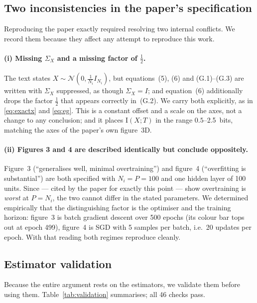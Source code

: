 \documentclass[11pt,a4paper]{article}
\newcommand{\I}{\mathrm{I}}
\newcommand{\Norm}{\mathcal{N}}
\begin{document}
\subsection{Two inconsistencies in the paper's specification}
\label{sec:inconsistencies}

Reproducing the paper exactly required resolving two internal conflicts. We
record them because they affect any attempt to reproduce this work.

\paragraph{(i) Missing $\Sigma_X$ and a missing factor of $\tfrac12$.} The text
states $X\sim\Norm(0,\tfrac{1}{N_i}I_{N_i})$, but equations~(5), (6) and
(G.1)--(G.3) are written with $\Sigma_X$ suppressed, as though $\Sigma_X=I$;
and equation~(6) additionally drops the factor $\tfrac12$ that appears correctly
in~(G.2). We carry both explicitly, as in \eqref{eq:exactx} and \eqref{eq:eg}.
This is a constant offset and a scale on the axes, not a change to any
conclusion; and it places $\I(X;T)$ in the range $0.5$--\SI{2.5}{bits}, matching
the axes of the paper's own figure~3D.

\paragraph{(ii) Figures 3 and 4 are described identically but conclude
oppositely.} Figure~3 (``generalises well, minimal overtraining'') and figure~4
(``overfitting is substantial'') are both specified with $N_i = P = 100$ and one
hidden layer of 100 units. Since \citet{advani2017high} --- cited by the paper
for exactly this point --- show overtraining is \emph{worst} at $P=N_i$, the two
cannot differ in the stated parameters. We determined empirically that the
distinguishing factor is the optimiser and the training horizon: figure~3 is
batch gradient descent over 500 epochs (its colour bar tops out at epoch 499),
figure~4 is SGD with 5 samples per batch, i.e.\ 20 updates per epoch. With that
reading both regimes reproduce cleanly.

\subsection{Estimator validation}
\label{sec:validation}

Because the entire argument rests on the estimators, we validate them before
using them. Table~\ref{tab:validation} summarises; all 46 checks pass.
\end{document}
